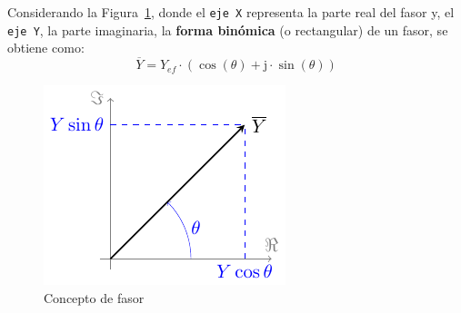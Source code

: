 

	
	Considerando la Figura~\ref{fig.fasor}, donde el \texttt{eje X} representa la parte real del fasor y, el \texttt{eje Y}, la parte imaginaria, la \textbf{forma binómica} (o rectangular) de un fasor, se obtiene como: 
	\begin{equation}
		\boxed{\overline{Y} = Y_{ef}\cdot(\cos(\theta)+\mathrm{j}\cdot\sin(\theta))}
	\end{equation}
	\begin{figure}[H]
		\centering
		\includegraphics{../figs/fasor.pdf}
		\caption{Concepto de fasor}
		\label{fig.fasor}
	\end{figure}
	
